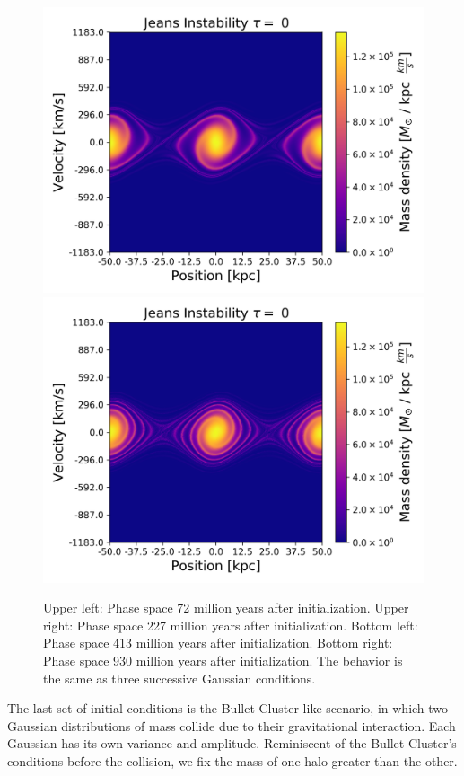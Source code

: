 \begin{figure}[h!]
    \includegraphics[scale=0.45]{imag/jeans40.png}
    \includegraphics[scale=0.45]{imag/jeans90.png}
    \caption{Upper left: Phase space 72 million years after initialization. Upper right: Phase space 227 million years after initialization. Bottom left: Phase space 413 million years after initialization. Bottom right: Phase space 930 million years after initialization. The behavior is the same as three successive Gaussian conditions.}
    \label{1dJeans}
\end{figure}

The last set of initial conditions is the Bullet Cluster-like scenario, in which two Gaussian distributions of mass collide due to their gravitational interaction.
Each Gaussian has its own variance and amplitude. Reminiscent of the Bullet Cluster's conditions before the collision, we fix the mass of one halo greater than the other. 

